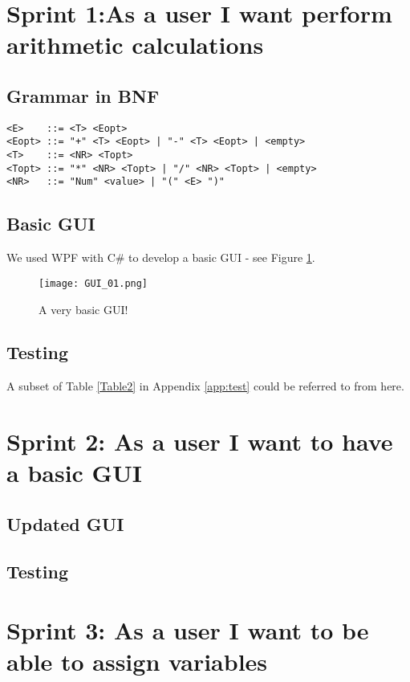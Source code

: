 \documentclass[a4paper, oneside, 11pt]{report}
\begin{document}
\section{Sprint 1:As a user I want perform arithmetic calculations}
\subsection{Grammar in BNF}
\begin{verbatim}
<E>    ::= <T> <Eopt>
<Eopt> ::= "+" <T> <Eopt> | "-" <T> <Eopt> | <empty>
<T>    ::= <NR> <Topt>
<Topt> ::= "*" <NR> <Topt> | "/" <NR> <Topt> | <empty>
<NR>   ::= "Num" <value> | "(" <E> ")"
\end{verbatim}

\subsection{Basic GUI}
We used WPF with C\# to develop a basic GUI - see Figure \ref{gui01}.

\begin{figure}[htb]
\begin{center}
\texttt{[image: GUI\_01.png]}
\caption{A very basic GUI!}
\label{gui01}
\end{center}
\end{figure}

\subsection{Testing}
A subset of Table \ref{Table2} in Appendix \ref{app:test} could be referred to from here.

\section{Sprint 2: As a user I want to have a basic GUI}

\subsection{Updated GUI}

\subsection{Testing}

\section{Sprint 3: As a user I want to be able to assign variables}
\end{document}
